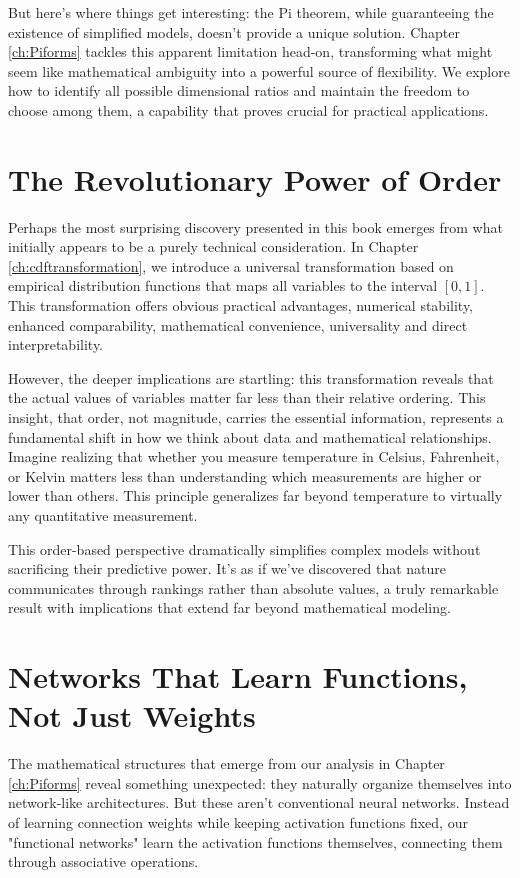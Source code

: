 \documentclass[
	11pt, %
	fleqn, %
	a4paper, %
]{LegrandOrangeBook}
\begin{document}
But here's where things get interesting: the Pi theorem, while guaranteeing the existence of simplified models, doesn't provide a unique solution. Chapter \ref{ch:Piforms} tackles this apparent limitation head-on, transforming what might seem like mathematical ambiguity into a powerful source of flexibility. We explore how to identify all possible dimensional ratios and maintain the freedom to choose among them, a capability that proves crucial for practical applications.

\section{The Revolutionary Power of Order}

Perhaps the most surprising discovery presented in this book emerges from what initially appears to be a purely technical consideration. In Chapter \ref{ch:cdftransformation}, we introduce a universal transformation based on empirical distribution functions that maps all variables to the interval $[0,1]$. This transformation offers obvious practical advantages, numerical stability, enhanced comparability, mathematical convenience, universality and direct interpretability.

However, the deeper implications are startling: this transformation reveals that the actual values of variables matter far less than their relative ordering. This insight, that order, not magnitude, carries the essential information, represents a fundamental shift in how we think about data and mathematical relationships. Imagine realizing that whether you measure temperature in Celsius, Fahrenheit, or Kelvin matters less than understanding which measurements are higher or lower than others. This principle generalizes far beyond temperature to virtually any quantitative measurement.

This order-based perspective dramatically simplifies complex models without sacrificing their predictive power. It's as if we've discovered that nature communicates through rankings rather than absolute values, a truly remarkable result with implications that extend far beyond mathematical modeling.

\section{Networks That Learn Functions, Not Just Weights}

The mathematical structures that emerge from our analysis in Chapter \ref{ch:Piforms} reveal something unexpected: they naturally organize themselves into network-like architectures. But these aren't conventional neural networks. Instead of learning connection weights while keeping activation functions fixed, our "functional networks" learn the activation functions themselves, connecting them through associative operations.
\end{document}

